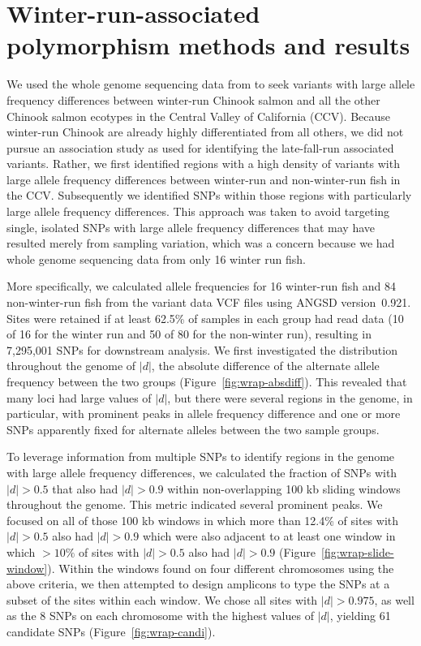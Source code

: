 
\section{Winter-run-associated polymorphism methods and results\label{sec:wrap-methods}}

We used the whole genome sequencing data from \citet{thompson2020complex} to seek variants with
large allele frequency differences between winter-run Chinook salmon and all the other
Chinook salmon ecotypes in the Central Valley of California (CCV).  Because winter-run Chinook are
already highly differentiated from all others, we did not pursue an association study as used
for identifying the late-fall-run associated variants.  Rather, we first identified regions with a high
density of variants with large allele frequency differences between winter-run and non-winter-run
fish in the CCV\@. Subsequently we identified SNPs within those regions with particularly
large allele frequency differences.  This approach was taken to avoid targeting single, isolated SNPs
with large allele frequency differences that may have resulted merely from sampling variation, which was a
concern because we had whole genome sequencing data from only 16 winter run fish.

More specifically, we calculated allele frequencies for 16 winter-run fish and 84 non-winter-run
fish from the  \citet{thompson2020complex} variant data VCF files using ANGSD version~0.921.
Sites were retained if at least 62.5\% of samples in each group had read data (10 of 16 for the
winter run and 50 of 80 for the non-winter run), resulting in 7,295,001 SNPs for downstream
analysis.  We first investigated the distribution throughout the genome of $|d|$, the absolute difference
of the alternate allele frequency between the two groups  (Figure~\ref{fig:wrap-absdiff}). This revealed
that many loci had large values of $|d|$, but there were several
regions in the genome, in particular, with prominent peaks in allele frequency difference and one
or more SNPs apparently fixed for alternate alleles between the two sample groups.  

To leverage information from multiple SNPs to identify regions in the genome with large
allele frequency differences, we calculated the fraction of SNPs with $|d| > 0.5$ that also
had $|d| > 0.9$ within non-overlapping 100 kb sliding windows throughout the genome. This metric indicated
several prominent peaks.  We focused on all of those
100 kb windows in which more than 12.4\% of sites with $|d|>0.5$ also had $|d|>0.9$ which were
also adjacent to at least one window in which $>10\%$ of sites with $|d|>0.5$ also had $|d|>0.9$ 
(Figure~\ref{fig:wrap-slide-window}).  Within the windows found on four different chromosomes using
the above criteria, we then attempted to design amplicons to type the SNPs at a subset of the sites
within each window.  We chose all sites with $|d|>0.975$, as well as the 8 SNPs on each chromosome
with the highest values of $|d|$, yielding 61 candidate SNPs (Figure~\ref{fig:wrap-candi}).  

